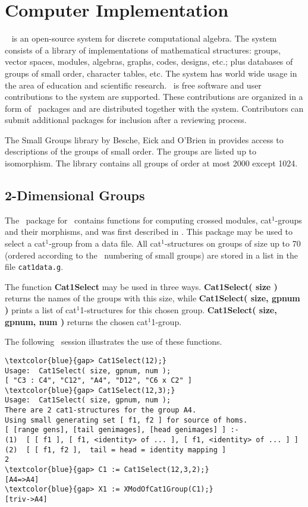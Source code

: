 \documentclass[a4paper,11pt]{article}
\theoremstyle{plain}
\theoremstyle{definition}
\begin{document}
\section{Computer Implementation}

\GAP\ \cite{gap} is an open-source system for discrete computational
algebra. The system consists of a library of implementations of mathematical
structures: groups, vector spaces, modules, algebras, graphs, codes,
designs, etc.; plus databases of groups of small order, character tables, etc. 
The system has world wide usage in the area of education and scientific research. 
\GAP\ is free software and user contributions to the system are supported. 
These contributions are organized in a form of \GAP\ packages 
and are distributed together with the system.  Contributors can
submit additional packages for inclusion after a reviewing process.

The Small Groups library by Besche, Eick and O'Brien in \cite{besche-eick-obrien} 
provides access to descriptions of the groups of small order. 
The groups are listed up to isomorphism. 
The library contains all groups of order at most 2000 except 1024.

\subsection{2-Dimensional Groups}

The \XMod\ package for \GAP\ contains functions for computing 
crossed modules, cat$^{1}$-groups and their morphisms, 
and was first described in \cite{xmod}. 
This package may be used to select a cat$^{1}$-group from a data file. 
All cat$^{1}$-structures on groups of size up to 70 
(ordered according to the \GAP\ numbering of small groups) 
are stored in a list in the file \texttt{cat1data.g}.

The function \textbf{Cat1Select} may be used in three ways. 
\textbf{Cat1Select( size )} returns the names of the groups with this size, 
while \textbf{Cat1Select( size, gpnum )} prints a list of cat$^1$1-structures 
for this chosen group. 
\textbf{Cat1Select( size, gpnum, num )} returns the chosen cat$^1$1-group.

The following \GAP\ session illustrates the use of these functions.

\begin{Verbatim}[frame=single, fontsize=\small, commandchars=\\\{\}]
\textcolor{blue}{gap> Cat1Select(12);}
Usage:  Cat1Select( size, gpnum, num );
[ "C3 : C4", "C12", "A4", "D12", "C6 x C2" ]
\textcolor{blue}{gap> Cat1Select(12,3);}
Usage:  Cat1Select( size, gpnum, num );
There are 2 cat1-structures for the group A4.
Using small generating set [ f1, f2 ] for source of homs.
[ [range gens], [tail genimages], [head genimages] ] :-
(1)  [ [ f1 ], [ f1, <identity> of ... ], [ f1, <identity> of ... ] ]
(2)  [ [ f1, f2 ],  tail = head = identity mapping ]
2
\textcolor{blue}{gap> C1 := Cat1Select(12,3,2);}
[A4=>A4]
\textcolor{blue}{gap> X1 := XModOfCat1Group(C1);}
[triv->A4]
\end{Verbatim}
\end{document}
